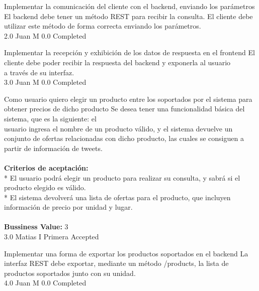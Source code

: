 		{Implementar la comunicación del cliente con el backend, enviando los parámetros} %
		{El backend debe tener un método REST para recibir la consulta. El cliente debe\\
utilizar este método de forma correcta enviando los parámetros.\\
} %
		{2.0} %
		{Juan M} %
		{0.0} %
		{Completed} %

		{Implementar la recepción y exhibición de los datos de respuesta en el frontend} %
		{El cliente debe poder recibir la respuesta del backend y exponerla al usuario\\
a través de su interfaz.\\
} %
		{3.0} %
		{Juan M} %
		{0.0} %
		{Completed} %


\vspace{20pt}

	{Como usuario quiero elegir un producto entre los soportados por el sistema para obtener precios de dicho producto} %
	{Se desea tener una funcionalidad básica del sistema, que es la siguiente: el\\
usuario ingresa el nombre de un producto válido, y el sistema devuelve un\\
conjunto de ofertas relacionadas con dicho producto, las cuales se consiguen a\\
partir de información de tweets.\\
  \\
\textbf{Criterios de aceptación:}\\
* El usuario podrá elegir un producto para realizar su consulta, y sabrá si el producto elegido es válido.  \\
* El sistema devolverá una lista de ofertas para el producto, que incluyen información de precio por unidad y lugar. \\
  \\
\textbf{Bussiness Value:} 3\\
} %
	{} %
	{3.0} %
	{Matias I} %
	{Primera} %
	{Accepted} %

		{Implementar una forma de exportar los productos soportados en el backend} %
		{La interfaz REST debe exportar, mediante un método /products, la lista de\\
productos soportados junto con su unidad.\\
} %
		{4.0} %
		{Juan M} %
		{0.0} %
		{Completed} %


